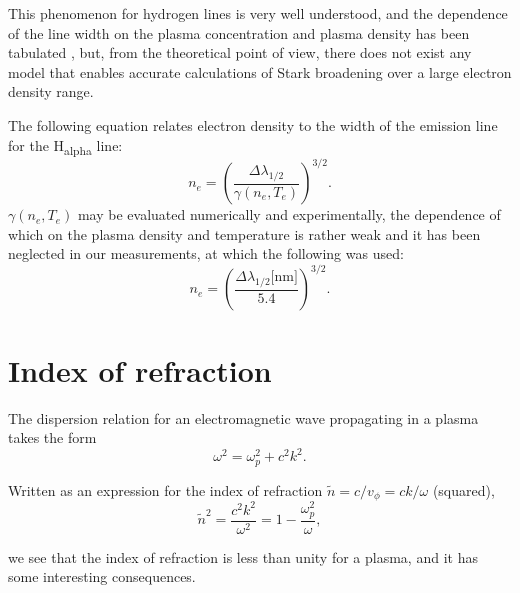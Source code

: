 \documentclass[justified,nofonts,nobib,openany]{tufte-book}
\begin{document}
This phenomenon for hydrogen lines is very well understood, and the dependence of the line width on the plasma concentration and plasma density has been tabulated \cite{Griem1964PlasmaSpectroscopy,Griem1974SpectralPlasmas.}, but, from the theoretical point of view, there does not exist any model that enables accurate calculations of Stark broadening over a large electron density range\cite{Griem2000StarkPlasmas}. 

The following equation relates electron density to the width of the emission line for the H\textsubscript{alpha} line:
\begin{equation}
n_e=\left( \frac{\Delta\lambda_{1/2}}{\gamma\left(n_e,T_e\right)}\right)^{3/2}.
\end{equation}
$\gamma\left(n_e,T_e\right)$ may be evaluated numerically and experimentally\cite{Griem2005ComparisonResults}, the dependence of which on the plasma density and temperature is rather weak and it has been neglected in our measurements, at which the following was used:
\begin{equation}
n_e=\left( \frac{\Delta\lambda_{1/2}\text{[nm]}}{5.4}\right)^{3/2}. \label{eq:delta_lambda}
\end{equation}
\section{Index of refraction}\label{sec:indexrefraction}

The dispersion relation \cite{Chen1984IntroductionFusion} for an electromagnetic wave propagating in a plasma takes the form 
\begin{equation}
\omega^2=\omega_p^2+c^2 k^2.
\end{equation}

Written as an expression for the index of refraction $\tilde{n}=c/v_\phi = ck/\omega$ (squared),
\begin{equation}
\tilde{n}^2=\frac{c^2 k^2}{\omega^2}=1-\frac{\omega_p^2}{\omega}, \label{eq:index_of_refraction}
\end{equation}

we see that the index of refraction is less than unity for a plasma, and it has some interesting consequences.
\end{document}
